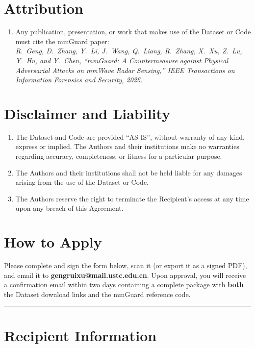 \documentclass[11pt]{article}
\makeatletter
\newcommand{\contactemail}{gengruixu@mail.ustc.edu.cn}
\makeatother
\begin{document}
\section{Attribution}
\begin{enumerate}[label=\arabic*.]
  \item Any publication, presentation, or work that makes use of the Dataset
        or Code must cite the mmGuard paper:\\[0.3em]
        \textit{R.\ Geng, D.\ Zhang, Y.\ Li, J.\ Wang, Q.\ Liang, R.\ Zhang,
        X.\ Xu, Z.\ Lu, Y.\ Hu, and Y.\ Chen, ``mmGuard: A Countermeasure
        against Physical Adversarial Attacks on mmWave Radar Sensing,'' IEEE
        Transactions on Information Forensics and Security, 2026.}
\end{enumerate}

\section{Disclaimer and Liability}
\begin{enumerate}[label=\arabic*.]
  \item The Dataset and Code are provided ``AS IS'', without warranty of any
        kind, express or implied. The Authors and their institutions make no
        warranties regarding accuracy, completeness, or fitness for a
        particular purpose.
  \item The Authors and their institutions shall not be held liable for any
        damages arising from the use of the Dataset or Code.
  \item The Authors reserve the right to terminate the Recipient's access at
        any time upon any breach of this Agreement.
\end{enumerate}

\section{How to Apply}
Please complete and sign the form below, scan it (or export it as a signed
PDF), and email it to \textbf{\contactemail}. Upon approval, you will receive
a confirmation email within two days containing a complete package with
\textbf{both} the Dataset download links and the mmGuard reference code.

\vspace{1em}
\hrule
\vspace{1em}

\section*{Recipient Information}
\end{document}
